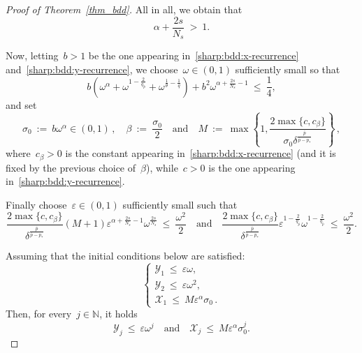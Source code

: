 \documentclass[leqno,10pt]{amsart}
\theoremstyle{plain}
\theoremstyle{remark}
\numberwithin{equation}{section}
\def\en{\mathbb{N}}
\newcommand{\eps}{\varepsilon}
\begin{document}
{\begin{proof}[Proof of Theorem~\ref{thm_bdd}]
All in all, we obtain that
\[
\alpha + \frac{2s}{N_s} \ > \ 1.
\]

Now, letting~$b>1$ be the one appearing in~\eqref{sharp:bdd:x-recurrence} and~\eqref{sharp:bdd:y-recurrence}, we choose~$\omega\in(0,1)$ sufficiently small so that
\begin{equation}\label{sharp:bdd:omega-choice}
{b\left(\omega^{\alpha}+ \omega^{1-\frac{2}{q_{\bar{p}}}} + \omega^{\frac{1}{\theta}-\frac{1}{q}}\right) + b^2 \omega^{\alpha+\frac{2s}{N_s}-1} \ \leq \ \frac{1}{4},}
\end{equation}
and set
\begin{equation}\label{eq:useful-def}
\sigma_0 \ := \ b \omega^\alpha \in (0,1)\,, \quad \beta \ := \ \frac{\sigma_0}{2} \quad \text{and} \quad M \ := \ \max \left\{1,\frac{2\max\{c,c_\beta\}}{\sigma_0\delta^\frac{\bar{p}}{\bar{p}-p_\ast}}\right\}\,,
\end{equation}
where~$c_\beta>0$ is the constant appearing in~\eqref{sharp:bdd:x-recurrence} (and it is fixed by the previous choice of~$\beta$), while~$c>0$ is the one appearing in~\eqref{sharp:bdd:y-recurrence}.

Finally choose~$\eps\in(0,1)$ sufficiently small such that
\begin{equation}\label{sharp:bdd:epsilon-choice}
\frac{2\max\{c,c_\beta\}}{\delta^\frac{\bar{p}}{\bar{p}-p_\ast}}(M+1)
\eps^{\alpha+\frac{2s}{N_s}-1}\omega^{\frac{2s}{N_s}} \ \leq \ \frac{\omega^2}{2} \quad \text{and} \quad 
{
\frac{2\max\{c,c_\beta\}}{\delta^\frac{\bar{p}}{\bar{p}-p_\ast}}\eps^{1-\frac{2}{q_{\bar{p}}}}\omega^{1-\frac{2}{q_{\bar{p}}}}
\ \leq  \ \frac{\omega^2}{2}.
}
\end{equation}


Assuming that the initial conditions below are satisfied:
\begin{equation}\label{sharp:bdd:initial-decay}
\begin{cases}
\mathcal{Y}_1 \ \leq \ \eps\omega,\\
\mathcal{Y}_2 \ \leq \ \eps\omega^2,\\
\mathcal{X}_1 \ \leq  \ M\eps^{\alpha}\sigma_0\,.
\end{cases}
\end{equation}
Then, for every~$j \in \en$, it holds
\begin{equation}\label{sharp:bdd:decay-induction}
\mathcal{Y}_j  \ \leq \ \eps\omega^j \quad \text{and} \quad 
\mathcal{X}_j \ \leq \  M\eps^{\alpha}\sigma_0^j.
\end{equation}


\end{proof}}
\end{document}
